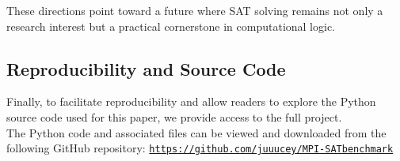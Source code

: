 \documentclass[11pt]{article}
\begin{document}
These directions point toward a future where SAT solving remains not only a research interest but a practical cornerstone in computational logic.

\subsection{Reproducibility and Source Code}
\hspace*{2em}
Finally, to facilitate reproducibility and allow readers to explore the Python source code used for this paper, we provide access to the full project.\\
\hspace*{2em}
The Python code and associated files can be viewed and downloaded from the following GitHub repository: 
    \texttt{\href{https://github.com/juuucey/MPI-SATbenchmark}{https://github.com/juuucey/MPI-SATbenchmark}}\\
\end{document}
